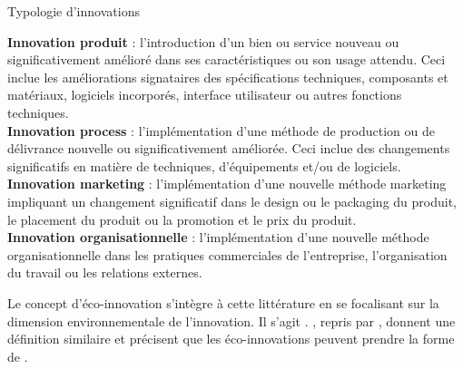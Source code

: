     \begin{encadre}
        \begin{tcolorbox}
        \caption{Typologie d'innovations}
        \label{encadre:typoinnov}
            \textbf{  Innovation produit} : l’introduction d’un bien ou service nouveau ou significativement amélioré dans ses caractéristiques ou son usage attendu. Ceci inclue les améliorations signataires des spécifications techniques, composants et matériaux, logiciels incorporés, interface utilisateur ou autres fonctions techniques. \\

            \textbf{ Innovation process} : l’implémentation d’une méthode de production ou de délivrance nouvelle ou significativement améliorée. Ceci inclue des changements significatifs en matière de techniques, d’équipements et/ou de logiciels. \\

            \textbf{ Innovation marketing} : l’implémentation d’une nouvelle méthode marketing impliquant un changement significatif dans le design ou le packaging du produit, le placement du produit ou la promotion et le prix du produit. \\

            \textbf{  Innovation organisationnelle} : l’implémentation d’une nouvelle méthode organisationnelle dans les pratiques commerciales de l’entreprise, l’organisation du travail ou les relations externes.
        \end{tcolorbox}
    \end{encadre}

    Le concept d'éco-innovation s'intègre à cette littérature en se focalisant sur la dimension environnementale de l'innovation. Il s'agit  \parencite{rennings2000redefining}. \textcite[][]{kemp2001survey}, repris par \textcite{horbach2008determinants}, donnent une définition similaire et précisent que les éco-innovations peuvent prendre la forme de . \\


